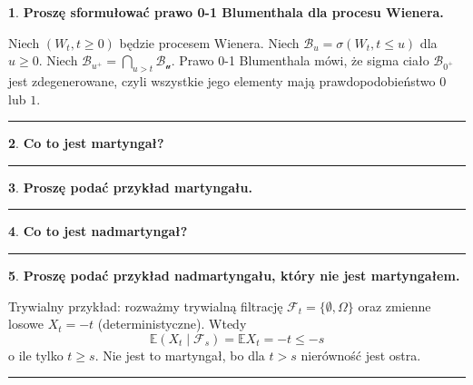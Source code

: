 \documentclass[
    twocolumn,
    twoside,
    fontsize=11pt,
    paper=A0,
    DIV=30
]{scrartcl}
\theoremstyle{definition}
\newtheorem{pytanie}{}
\theoremstyle{break}
\newenvironment{odpowiedź}{\vspace{-0.7em}}{\vspace{0.3em}\hrule}
\begin{document}
\begin{pytanie}
\textbf{Proszę sformułować prawo 0-1 Blumenthala dla procesu Wienera.}
\end{pytanie}
\begin{odpowiedź}
    Niech $(W_t, t\geq 0)$ będzie procesem Wienera. Niech
    $\mathcal{B}_u = \sigma(W_t, t\leq u)$ dla $u \geq 0$.
    Niech $\mathcal{B}_{u^+} = \bigcap_{u > t} \mathcal{B_u}$.
    Prawo 0-1 Blumenthala mówi, że sigma ciało $ \mathcal{B_{0^+}}$
    jest zdegenerowane, czyli wszystkie jego elementy mają
    prawdopodobieństwo $0$ lub $1$.
\end{odpowiedź}


\begin{pytanie}
\textbf{Co to jest martyngał?}
\end{pytanie}
\begin{odpowiedź}
\end{odpowiedź}


\begin{pytanie}
\textbf{Proszę podać przykład martyngału.}
\end{pytanie}
\begin{odpowiedź}
\end{odpowiedź}


\begin{pytanie}
\textbf{Co to jest nadmartyngał?}
\end{pytanie}
\begin{odpowiedź}
\end{odpowiedź}


\begin{pytanie}
\textbf{Proszę podać przykład nadmartyngału, który nie jest martyngałem.}
\end{pytanie}
\begin{odpowiedź}
    Trywialny przykład: rozważmy trywialną filtrację
    $\mathcal{F}_t = \{\emptyset, \Omega\}$ oraz zmienne losowe
    $X_t = -t$ (deterministyczne). Wtedy  \[
    \mathbb{E}(X_t\mid \mathcal{F}_s) = \mathbb{E}X_t = -t \leq -s
    \] 
    o ile tylko $t \geq s$. Nie jest to martyngał, bo dla $t > s$
    nierówność jest ostra.
\end{odpowiedź}
\end{document}
